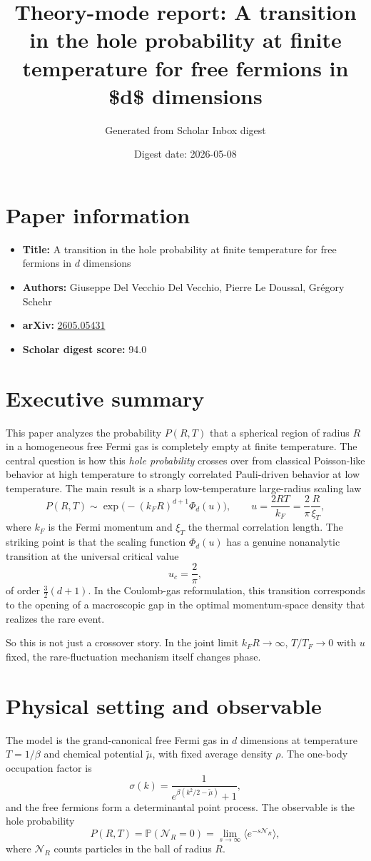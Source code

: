 \documentclass[11pt]{article}
\title{\textbf{Theory-mode report: A transition in the hole probability at finite temperature for free fermions in \$d\$ dimensions}}
\author{Generated from Scholar Inbox digest}
\date{Digest date: 2026-05-08}
\begin{document}
\maketitle
\section*{Paper information}
\begin{itemize}[leftmargin=1.5em]
\item \textbf{Title:} A transition in the hole probability at finite temperature for free fermions in $d$ dimensions
\item \textbf{Authors:} Giuseppe Del Vecchio Del Vecchio, Pierre Le Doussal, Grégory Schehr
\item \textbf{arXiv:} \href{https://arxiv.org/abs/2605.05431}{2605.05431}
\item \textbf{Scholar digest score:} 94.0
\end{itemize}

\section*{Executive summary}
This paper analyzes the probability $P(R,T)$ that a spherical region of radius $R$ in a homogeneous free Fermi gas is completely empty at finite temperature. The central question is how this \emph{hole probability} crosses over from classical Poisson-like behavior at high temperature to strongly correlated Pauli-driven behavior at low temperature. The main result is a sharp low-temperature large-radius scaling law
\[
P(R,T)\sim \exp\big(-(k_F R)^{d+1}\Phi_d(u)\big),
\qquad u=\frac{2RT}{k_F}=\frac{2}{\pi}\frac{R}{\xi_T},
\]
where $k_F$ is the Fermi momentum and $\xi_T$ the thermal correlation length. The striking point is that the scaling function $\Phi_d(u)$ has a genuine nonanalytic transition at the universal critical value
\[
u_c=\frac{2}{\pi},
\]
of order $\frac32(d+1)$. In the Coulomb-gas reformulation, this transition corresponds to the opening of a macroscopic gap in the optimal momentum-space density that realizes the rare event.

So this is not just a crossover story. In the joint limit $k_F R\to\infty$, $T/T_F\to0$ with $u$ fixed, the rare-fluctuation mechanism itself changes phase.

\section*{Physical setting and observable}
The model is the grand-canonical free Fermi gas in $d$ dimensions at temperature $T=1/\beta$ and chemical potential $\tilde\mu$, with fixed average density $\rho$. The one-body occupation factor is
\[
\sigma(k)=\frac{1}{e^{\beta(k^2/2-\tilde\mu)}+1},
\]
and the free fermions form a determinantal point process. The observable is the hole probability
\[
P(R,T)=\mathbb P(\mathcal N_R=0)=\lim_{s\to\infty}\langle e^{-s\mathcal N_R}\rangle,
\]
where $\mathcal N_R$ counts particles in the ball of radius $R$.
\end{document}

